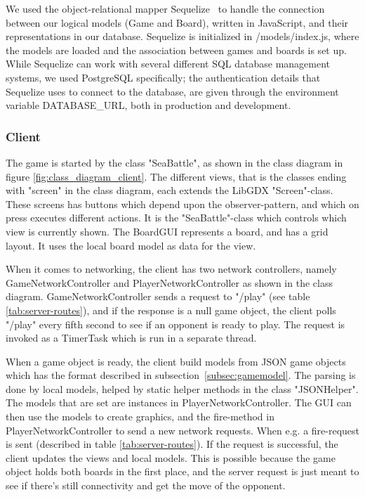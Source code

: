 We used the object-relational mapper Sequelize~\cite{sequelize} to handle the connection between our logical models (Game and Board), written in JavaScript, and their representations in our database. Sequelize is initialized in /models/index.js, where the models are loaded and the association between games and boards is set up. While Sequelize can work with several different SQL database management systems, we used PostgreSQL specifically; the authentication details that Sequelize uses to connect to the database, are given through the environment variable DATABASE\_URL, both in production and development.

\subsubsection{Client}
The game is started by the class "SeaBattle", as shown in the class diagram in figure \ref{fig:class_diagram_client}. The different views, that is the classes ending with "screen" in the class diagram, each extends the LibGDX "Screen"-class. These screens has buttons which depend upon the observer-pattern, and which on press executes different actions. It is the "SeaBattle"-class which controls which view is currently shown. The BoardGUI represents a board, and has a grid layout. It uses the local board model as data for the view.

When it comes to networking, the client has two network controllers, namely GameNetworkController and PlayerNetworkController as shown in the class diagram. GameNetworkController sends a request to "/play" (see table \ref{tab:server-routes}), and if the response is a null game object, the client polls "/play" every fifth second to see if an opponent is ready to play. The request is invoked as a TimerTask which is run in a separate thread. 

When a game object is ready, the client build models from JSON game objects which has the format described in subsection~\ref{subsec:gamemodel}. The parsing is done by local models, helped by static helper methods in the class "JSONHelper". The models that are set are instances in PlayerNetworkController. The GUI can then use the models to create graphics, and the fire-method in PlayerNetworkController to send a new network requests. When e.g. a fire-request is sent (described in table \ref{tab:server-routes}). If the request is successful, the client updates the views and local models. This is possible because the game object holds both boards in the first place, and the server request is just meant to see if there's still connectivity and get the move of the opponent.

